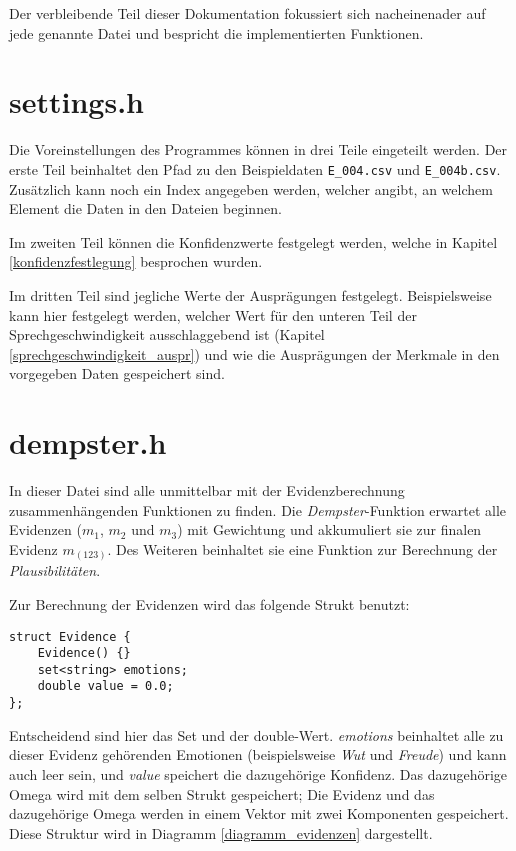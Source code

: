  Der verbleibende Teil dieser Dokumentation fokussiert sich nacheinenader auf jede genannte Datei und bespricht die implementierten Funktionen.

\section{settings.h}
Die Voreinstellungen des Programmes können in drei Teile eingeteilt werden.
Der erste Teil beinhaltet den Pfad zu den Beispieldaten \verb|E_004.csv| und \verb|E_004b.csv|. Zusätzlich kann noch ein Index angegeben werden, welcher angibt, an welchem Element die Daten in den Dateien beginnen.

Im zweiten Teil können die Konfidenzwerte festgelegt werden, welche in Kapitel \ref{konfidenzfestlegung} besprochen wurden.

Im dritten Teil sind jegliche Werte der Ausprägungen festgelegt. Beispielsweise kann hier festgelegt werden, welcher Wert für den unteren Teil der Sprechgeschwindigkeit ausschlaggebend ist (Kapitel \ref{sprechgeschwindigkeit_auspr}) und wie die Ausprägungen der Merkmale in den vorgegeben Daten gespeichert sind.

\section{dempster.h}
In dieser Datei sind alle unmittelbar mit der Evidenzberechnung zusammenhängenden Funktionen zu finden. Die \textit{Dempster}-Funktion erwartet alle Evidenzen (\(m_1\), \(m_2\) und \(m_3\)) mit Gewichtung und akkumuliert sie zur finalen Evidenz \(m_(123)\). Des Weiteren beinhaltet sie eine Funktion zur Berechnung der \textit{Plausibilitäten}.

Zur Berechnung der Evidenzen wird das folgende Strukt benutzt:

\begin{lstlisting}[caption=Strukt zur Evidenzberechnung, label=structcode]
struct Evidence {
	Evidence() {}
	set<string> emotions;
	double value = 0.0;
};
\end{lstlisting}

Entscheidend sind hier das Set und der double-Wert. \textit{emotions} beinhaltet alle zu dieser Evidenz gehörenden Emotionen (beispielsweise \textit{Wut} und \textit{Freude}) und kann auch leer sein, und \textit{value} speichert die dazugehörige Konfidenz. Das dazugehörige Omega wird mit dem selben Strukt gespeichert; 
Die Evidenz und das dazugehörige Omega werden in einem Vektor mit zwei Komponenten gespeichert. Diese Struktur wird in Diagramm \ref{diagramm_evidenzen} dargestellt.

